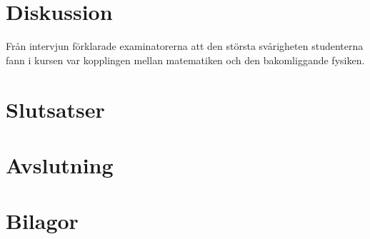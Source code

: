 \documentclass[]{article}
\begin{document}
\section{Diskussion}




Från intervjun förklarade examinatorerna att den största svårigheten studenterna fann i kursen
var kopplingen mellan matematiken och den bakomliggande fysiken. %



\section{Slutsatser}

\section{Avslutning}
%

\newpage

\printbibliography

\section{Bilagor}
\end{document}
